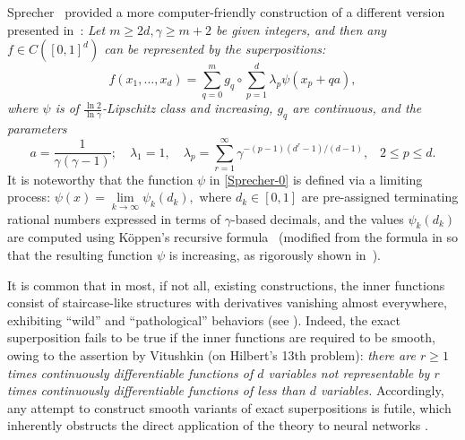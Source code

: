 \documentclass[10pt,reqno,final]{amsart}
\theoremstyle{remark}
\theoremstyle{definition}
\newcommand{\wll}[1]{#1}
\begin{document}
Sprecher~\cite{Sprecher1963dissertation,Sprecher1996numerical,Sprecher1997numerical} provided a more  computer-friendly construction of a different version presented in~\cite{Sprecher1997numerical}: {\em Let  $m\ge 2d, \gamma\ge m+2$ be given integers, and then any $f\in C([0,1]^d)$ can be represented by the superpositions:
\begin{equation}\label{Sprecher-0}
f(x_1, \ldots, x_d)=\displaystyle\sum_{q=0}^{m} {g_q}\circ\sum_{p=1}^d \lambda_p {\psi}(x_p+q a),
\end{equation}
where $\psi$ is  of 
$\frac{\ln 2} {\ln \gamma}$-Lipschitz class and  increasing, $g_q$ are continuous, and the parameters}  
\begin{equation}\label{alambda} 
a=\frac{1}{\gamma(\gamma-1)};\quad   \lambda_1=1, \quad  \lambda_p=\sum_{r=1}^{\infty} \gamma^{-(p-1)(d^r-1) /(d-1)},\;\;\; 2\le p\le d.
\end{equation} 
It is noteworthy that the function $\psi$ in \eqref{Sprecher-0} is defined via a limiting process:
\(\psi(x) = \lim\limits_{k \to \infty} \psi_k(d_k),\)
where \( d_k\in [0,1] \) are pre-assigned terminating rational numbers expressed in terms of \(\gamma\)-based decimals, and the values \(\psi_k(d_k)\) are computed using Köppen's recursive formula~\cite{Koppen2002} (modified from the formula in \cite{Sprecher1996numerical} so that the resulting function 
\(\psi\) is increasing, as rigorously shown in~\cite{Braun2009constructive}). 



It is common that in most, if not all, existing constructions, the inner functions consist of staircase-like structures with derivatives vanishing almost everywhere, exhibiting “wild” and “pathological” behaviors (see  \cite{Girosi1989,Sprecher2017algebra,Demb2021note}). 
Indeed, the  exact superposition  fails to be true  if the inner functions are required to be smooth, owing to  the assertion by 
Vitushkin \cite{Vitushkin1954,Vitushkin2004} (on Hilbert's 13th problem): {\em there are $r\ge 1$ times continuously differentiable functions \wll{of $d$ variables}  not representable by $r$ times continuously differentiable functions of less than $d$ variables.}  Accordingly, any attempt to construct smooth variants of exact superpositions is futile, which inherently obstructs the direct application of the theory to neural networks \cite{HechtNielsen1987,Girosi1989,Demb2021note}.
\end{document}
